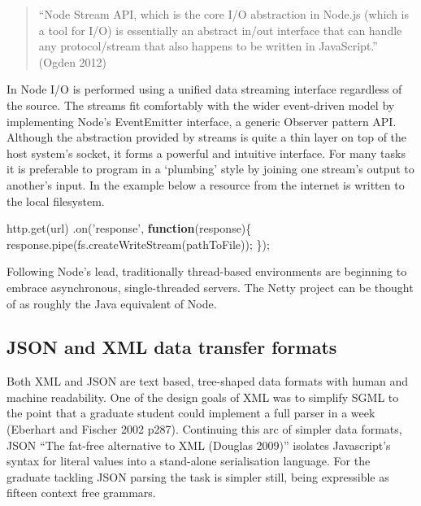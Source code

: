 \documentclass[12pt, ]{article}
\newenvironment{Shaded}{}{}
\newcommand{\KeywordTok}[1]{\textcolor[rgb]{0.00,0.44,0.13}{\textbf{{#1}}}}
\newcommand{\StringTok}[1]{\textcolor[rgb]{0.25,0.44,0.63}{{#1}}}
\newcommand{\OtherTok}[1]{\textcolor[rgb]{0.00,0.44,0.13}{{#1}}}
\newcommand{\FunctionTok}[1]{\textcolor[rgb]{0.02,0.16,0.49}{{#1}}}
\newcommand{\NormalTok}[1]{{#1}}
\begin{document}
\begin{quote}
``Node Stream API, which is the core I/O abstraction in Node.js (which
is a tool for I/O) is essentially an abstract in/out interface that can
handle any protocol/stream that also happens to be written in
JavaScript.'' (Ogden 2012)
\end{quote}

In Node I/O is performed using a unified data streaming interface
regardless of the source. The streams fit comfortably with the wider
event-driven model by implementing Node's EventEmitter interface, a
generic Observer pattern API. Although the abstraction provided by
streams is quite a thin layer on top of the host system's socket, it
forms a powerful and intuitive interface. For many tasks it is
preferable to program in a `plumbing' style by joining one stream's
output to another's input. In the example below a resource from the
internet is written to the local filesystem.

\begin{Shaded}
\begin{Highlighting}[]
\OtherTok{http}\NormalTok{.}\FunctionTok{get}\NormalTok{(url)}
   \NormalTok{.}\FunctionTok{on}\NormalTok{(}\StringTok{'response'}\NormalTok{, }\KeywordTok{function}\NormalTok{(response)\{}
      \OtherTok{response}\NormalTok{.}\FunctionTok{pipe}\NormalTok{(}\OtherTok{fs}\NormalTok{.}\FunctionTok{createWriteStream}\NormalTok{(pathToFile));}
   \NormalTok{\});}
\end{Highlighting}
\end{Shaded}

Following Node's lead, traditionally thread-based environments are
beginning to embrace asynchronous, single-threaded servers. The Netty
project can be thought of as roughly the Java equivalent of Node.

\subsection{JSON and XML data transfer formats}\label{jsonxml}

Both XML and JSON are text based, tree-shaped data formats with human
and machine readability. One of the design goals of XML was to simplify
SGML to the point that a graduate student could implement a full parser
in a week (Eberhart and Fischer 2002 p287). Continuing this arc of
simpler data formats, JSON ``The fat-free alternative to XML (Douglas
2009)'' isolates Javascript's syntax for literal values into a
stand-alone serialisation language. For the graduate tackling JSON
parsing the task is simpler still, being expressible as fifteen context
free grammars.
\end{document}
